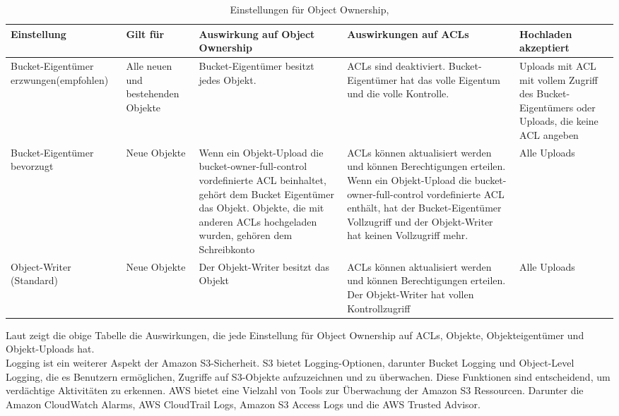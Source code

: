\begin{table}[!h]
\begin{tabular}{ |p{2cm}|p{2.1cm}|p{2.6cm}|p{2.6cm}|p{2.5cm}| }
\hline
\textbf{Einstellung} & \textbf{Gilt für} & \textbf{Auswirkung auf Object Ownership} & \textbf{Auswirkungen auf ACLs} & \textbf{Hochladen akzeptiert} \\
\hline
Bucket-Eigentümer erzwungen(empfohlen) & Alle neuen und bestehenden Objekte & Bucket-Eigentümer besitzt jedes Objekt. & ACLs sind deaktiviert. Bucket-Eigentümer hat das volle Eigentum und die volle Kontrolle. & Uploads mit ACL mit vollem Zugriff des Bucket-Eigentümers oder Uploads, die keine ACL angeben \\
\hline
Bucket-Eigentümer bevorzugt & Neue Objekte   & Wenn ein Objekt-Upload die bucket-owner-full-control vordefinierte ACL beinhaltet, gehört dem Bucket Eigentümer das Objekt. Objekte, die mit anderen ACLs hochgeladen wurden, gehören dem Schreibkonto & ACLs können aktualisiert werden und können Berechtigungen erteilen. Wenn ein Objekt-Upload die bucket-owner-full-control vordefinierte ACL enthält, hat der Bucket-Eigentümer Vollzugriff und der Objekt-Writer hat keinen Vollzugriff mehr. & Alle Uploads \\
\hline
Object-Writer (Standard) & Neue Objekte & Der Objekt-Writer besitzt das Objekt & ACLs können aktualisiert werden und können Berechtigungen erteilen. Der Objekt-Writer hat vollen Kontrollzugriff & Alle Uploads \\
\hline
\end{tabular}
\caption{Einstellungen für Object Ownership, }
\end{table}


Laut \citeauthor{aws-iam-s3} zeigt die obige Tabelle die Auswirkungen, die jede Einstellung für Object Ownership auf ACLs, Objekte, Objekteigentümer und Objekt-Uploads hat.\\

Logging ist ein weiterer Aspekt der Amazon S3-Sicherheit. S3 bietet Logging-Optionen, darunter Bucket Logging und Object-Level Logging, die es Benutzern ermöglichen, Zugriffe auf S3-Objekte aufzuzeichnen und zu überwachen. Diese Funktionen sind entscheidend, um verdächtige Aktivitäten zu erkennen. AWS bietet eine Vielzahl von Tools zur Überwachung der Amazon S3 Ressourcen. Darunter die Amazon CloudWatch Alarms, AWS CloudTrail Logs, Amazon S3 Access Logs und die AWS Trusted Advisor.\\

\newpage

